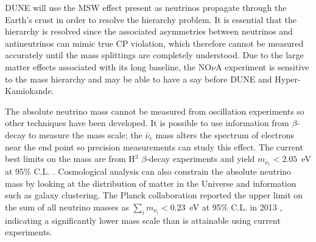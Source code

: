 DUNE will use the MSW effect present as neutrinos propagate through the Earth's crust in order to resolve the hierarchy problem.  It is essential that the hierarchy is resolved since the associated asymmetries between neutrinos and antineutrinos can mimic true CP violation, which therefore cannot be measured accurately until the mass splittings are completely understood.  Due to the large matter effects associated with its long baseline, the NO$\nu$A experiment is sensitive to the mass hierarchy and may be able to have a say before DUNE and Hyper-Kamiokande.

The absolute neutrino mass cannot be measured from oscillation experiments so other techniques have been developed.  It is possible to use information from $\beta$-decay to measure the mass scale; the $\bar{\nu}_e$ mass alters the spectrum of electrons near the end point so precision measurements can study this effect.  The current best limits on the mass are from H$^3$ $\beta$-decay experiments and yield $m_{\bar{\nu}_e} < 2.05$~eV at 95\% C.L. \cite{Triotsk2011,Mainz2005}.  Cosmological analysis can also constrain the absolute neutrino mass by looking at the distribution of matter in the Universe and information such as galaxy clustering.  The Planck collaboration reported the upper limit on the sum of all neutrino masses as $\sum_i m_{\nu_i} < 0.23$~eV at 95\% C.L. in 2013 \cite{Planck2013}, indicating a significantly lower mass scale than is attainable using current experiments.
